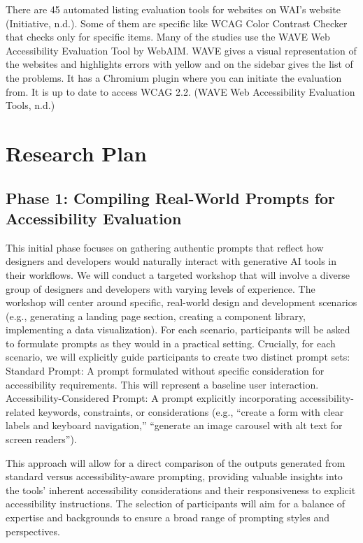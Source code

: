 \documentclass{article}
\begin{document}
There are 45 automated listing  evaluation tools for websites on WAI’s website (Initiative, n.d.).
Some of them are specific like WCAG Color Contrast Checker that checks only for specific items.
Many of the studies use the WAVE Web Accessibility Evaluation Tool by WebAIM.
WAVE gives a visual representation of the websites and highlights errors with yellow and on the sidebar gives the list of the problems.
It has a Chromium plugin where you can initiate the evaluation from.  It is up to date to access WCAG 2.2.
(WAVE Web Accessibility Evaluation Tools, n.d.)

\section{Research Plan}

\subsection{Phase 1: Compiling Real-World Prompts for Accessibility Evaluation}

This initial phase focuses on gathering authentic prompts
that reflect how designers and developers would naturally interact with generative AI tools in their workflows.
We will conduct a targeted workshop that will involve a diverse group of designers and developers with varying levels of experience.
The workshop will center around specific, real-world design and development scenarios
(e.g., generating a landing page section, creating a component library, implementing a data visualization).
For each scenario, participants will be asked to formulate prompts as they would in a practical setting.
Crucially, for each scenario, we will explicitly guide participants to create two distinct prompt sets:
Standard Prompt: A prompt formulated without specific consideration for accessibility requirements. This will represent a baseline user interaction.
Accessibility-Considered Prompt: A prompt explicitly incorporating accessibility-related keywords, constraints, or considerations
(e.g., ``create a form with clear labels and keyboard navigation,'' ``generate an image carousel with alt text for screen readers'').

This approach will allow for a direct comparison of the outputs generated from standard versus accessibility-aware prompting,
providing valuable insights into the tools' inherent accessibility considerations and their responsiveness to explicit accessibility instructions.
The selection of participants will aim for a balance of expertise and backgrounds to ensure a broad range of prompting styles and perspectives.
\end{document}
